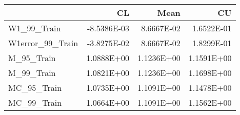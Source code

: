 \begin{tabular}{lrrr}
\toprule
{} &          CL &       Mean &         CU \\
\midrule
W1\_99\_Train      & -8.5386E-03 & 8.6667E-02 & 1.6522E-01 \\
W1error\_99\_Train & -3.8275E-02 & 8.6667E-02 & 1.8299E-01 \\
M\_95\_Train       &  1.0888E+00 & 1.1236E+00 & 1.1591E+00 \\
M\_99\_Train       &  1.0821E+00 & 1.1236E+00 & 1.1698E+00 \\
MC\_95\_Train      &  1.0735E+00 & 1.1091E+00 & 1.1478E+00 \\
MC\_99\_Train      &  1.0664E+00 & 1.1091E+00 & 1.1562E+00 \\
\bottomrule
\end{tabular}

